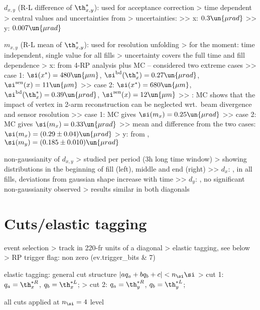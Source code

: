 \> $d_{x, y}$ (R-L difference of $\th_{x, y}^*$): used for acceptance correction
\>> time dependent
\>> central values and uncertainties from 
\>> uncertainties:
\>>> x: $0.3\un{\mu rad}$
\>>> y: $0.007\un{\mu rad}$

\> $m_{x, y}$ (R-L mean of $\th_{x, y}^*$): used for resolution unfolding
\>> for the moment: time independent, single value for all fills
\>> uncertainty covers the full time and fill dependence
\>> x: from 4-RP analysis plus MC -- considered two extreme cases
\>>> case 1: $\si(x^*) = 480\un{\mu m}$, $\si^{\rm bd}(\th^*_x) = 0.27\un{\mu rad}$, $\si^{\rm sen}(x) = 11\un{\mu m}$
\>>> case 2: $\si(x^*) = 680\un{\mu m}$, $\si^{\rm bd}(\th^*_x) = 0.39\un{\mu rad}$, $\si^{\rm sen}(x) = 12\un{\mu m}$
\>>> : MC shows that the impact of vertex in 2-arm reconstruction can be neglected wrt.~beam divergence and sensor resolution
\>>> case 1: MC gives $\si(m_x) = 0.25\un{\mu rad}$
\>>> case 2: MC gives $\si(m_x) = 0.33\un{\mu rad}$
\>>> mean and difference from the two cases: $\si(m_x) = (0.29 \pm 0.04)\un{\mu rad}$
\>> y: from , $\si(m_y) = (0.185 \pm 0.010)\un{\mu rad}$

\> non-gaussianity of $d_{x,y}$
\>> studied per period (3h long time window)
\>> showing distributions in the beginning of fill (left), middle and end (right)
\>>> $d_x$: , in all fills, deviations from gaussian shape increase with time
\>>> $d_y$: , no significant non-gaussianity observed
\>> results similar in both diagonals


\section{Cuts/elastic tagging}

\> event selection
\>> track in 220-fr units of a diagonal
\>> elastic tagging, see below
\>> RP trigger flag: non zero (ev.trigger\_bits \& 7)

\> elastic tagging: general cut structure $| a q_a + b q_b + c| < n_\si  \si$
\>> cut 1: $q_a = \th_x^{*R}$, $q_b = \th_x^{*L}$; 
\>> cut 2: $q_a = \th_y^{*R}$, $q_b = \th_y^{*L}$; 

\> all cuts applied at $n_\si = 4$ level

